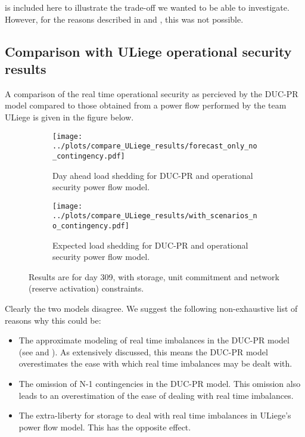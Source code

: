 \documentclass[number,times]{elsarticle}
\begin{document}
 is included here to illustrate the trade-off we wanted to be able to investigate. However, for the reasons described in  and , this was not possible.

\subsection{Comparison with ULiege operational security results} \label{sec:ULiege_comparison}

A comparison of the real time operational security as percieved by the DUC-PR model compared to those obtained from a power flow performed by the team ULiege is given in the figure below.

\begin{figure}[h]
    \centering
    \begin{subfigure}[t]{0.9\textwidth}
        \centering
        \texttt{[image: ../plots/compare\_ULiege\_results/forecast\_only\_no\_contingency.pdf]}
        \caption{Day ahead load shedding for DUC-PR and operational security power flow model.}
    \end{subfigure}
    \begin{subfigure}[t]{0.9\textwidth}
        \centering
        \texttt{[image: ../plots/compare\_ULiege\_results/with\_scenarios\_no\_contingency.pdf]}
        \caption{Expected load shedding for DUC-PR and operational security power flow model.}
    \end{subfigure}
\caption{Results are for day 309, with storage, unit commitment and network (reserve activation) constraints.\label{fig:Uliege_compare}}
\end{figure}

Clearly the two models disagree. We suggest the following non-exhaustive list of reasons why this could be:

\begin{itemize}
    \item The approximate modeling of real time imbalances in the DUC-PR model (see  and ). As extensively discussed, this means the DUC-PR model overestimates the ease with which real time imbalances may be dealt with.
    \item The omission of N-1 contingencies in the DUC-PR model. This omission also leads to an overestimation of the ease of dealing with real time imbalances.
    \item The extra-liberty for storage to deal with real time imbalances in ULiege's power flow model. This has the opposite effect.
\end{itemize}
\end{document}

